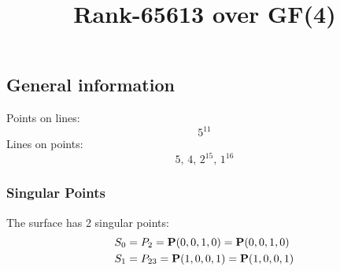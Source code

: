 \documentclass{article}
\newcommand\setTBstruts{\def\T{\rule{0pt}{2.6ex}}%
\def\B{\rule[-1.2ex]{0pt}{0pt}}}
\newcommand{\bP}{{\bf P}}
\begin{document}
 
\setTBstruts



{\allowdisplaybreaks%






\title{Rank-65613 over GF(4)}
\author{}%
\maketitle%
%
{}



\subsection*{General information}
Points on lines:
$$
5^{11}$$
Lines on points:
$$
5,\,4,\,2^{15},\,1^{16}$$
\subsubsection*{Singular Points}
The surface has 2 singular points:\\
\begin{align*}
S_{0} &= P_{2}=\bP(0, 0, 1, 0) = \bP(0, 0, 1, 0)\\
S_{1} &= P_{23}=\bP(1, 0, 0, 1) = \bP(1, 0, 0, 1)\\
\end{align*}
}
\end{document}
